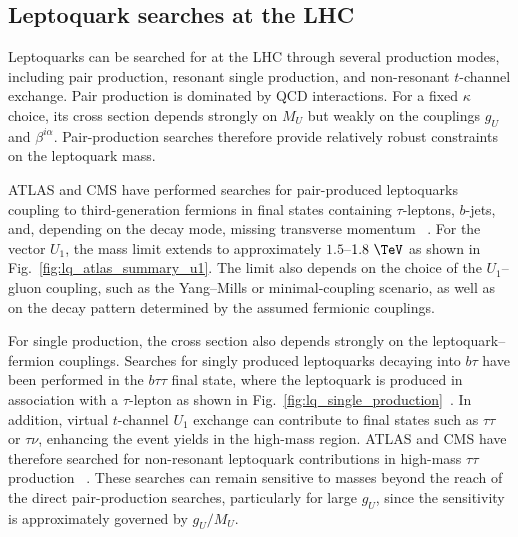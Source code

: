 \subsection{Leptoquark searches at the LHC}
\label{subsec:lq_searches_lhc}

Leptoquarks can be searched for at the LHC through several production modes, including pair production, resonant single production, and non-resonant $t$-channel exchange. Pair production is dominated by QCD interactions. For a fixed $\kappa$ choice, its cross section depends strongly on $M_U$ but weakly on the couplings $g_U$ and $\beta^{i\alpha}$. Pair-production searches therefore provide relatively robust constraints on the leptoquark mass.

ATLAS and CMS have performed searches for pair-produced leptoquarks coupling
to third-generation fermions in final states containing $\tau$-leptons,
$b$-jets, and, depending on the decay mode, missing transverse momentum
~\cite{ATLAS2023LQBTau,CMS2021LQThirdGen}.
For the vector $U_{1}$, the mass limit extends to approximately
$1.5$--$1.8~\TeV$ as shown in Fig.~\ref{fig:lq_atlas_summary_u1}. The limit also depends on the choice of the $U_{1}$--gluon coupling, such as the Yang--Mills or minimal-coupling scenario, as well as on the decay pattern determined by the assumed fermionic couplings.

For single production, the cross section also depends strongly on the leptoquark--fermion couplings. Searches for singly produced leptoquarks decaying into $b\tau$ have been performed in the $b\tau\tau$ final state, where the leptoquark is produced in association with a $\tau$-lepton as shown in Fig.~\ref{fig:lq_single_production}~\cite{ATLAS2023LQBTau,CMS2024LQBTau}. In addition, virtual $t$-channel $U_1$ exchange can contribute to final states such as $\tau\tau$ or $\tau\nu$, enhancing the event yields in the high-mass region. ATLAS and CMS have therefore searched for non-resonant leptoquark contributions in high-mass $\tau\tau$ production ~\cite{CMS2024LQBTau,ATLAS2025HighMassTauTau,CMS2023TauTauLQ}. These searches can remain sensitive to masses beyond the reach of the direct pair-production searches, particularly for large $g_U$, since the sensitivity is approximately governed by $g_U/M_U$.

